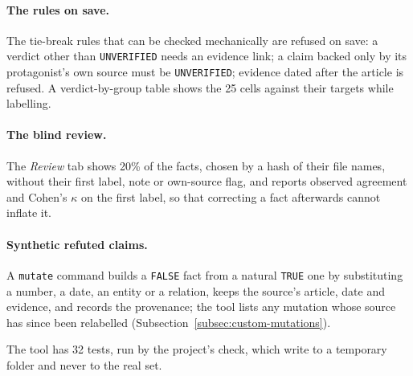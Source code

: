\paragraph{The rules on save.} The tie-break rules that can be checked
mechanically are refused on save: a verdict other than
\texttt{UNVERIFIED} needs an evidence link; a claim backed only by its
protagonist's own source must be \texttt{UNVERIFIED}; evidence dated
after the article is refused. A verdict-by-group table shows the 25
cells against their targets while labelling.

\paragraph{The blind review.} The \emph{Review} tab shows 20\% of the
facts, chosen by a hash of their file names, without their first label,
note or own-source flag, and reports observed agreement and Cohen's
$\kappa$ on the first label, so that correcting a fact afterwards
cannot inflate it.

\paragraph{Synthetic refuted claims.} A \texttt{mutate} command builds
a \texttt{FALSE} fact from a natural \texttt{TRUE} one by substituting a
number, a date, an entity or a relation, keeps the source's article,
date and evidence, and records the provenance; the tool lists any
mutation whose source has since been relabelled
(Subsection~\ref{subsec:custom-mutations}).

The tool has 32 tests, run by the project's check, which write to a
temporary folder and never to the real set.
